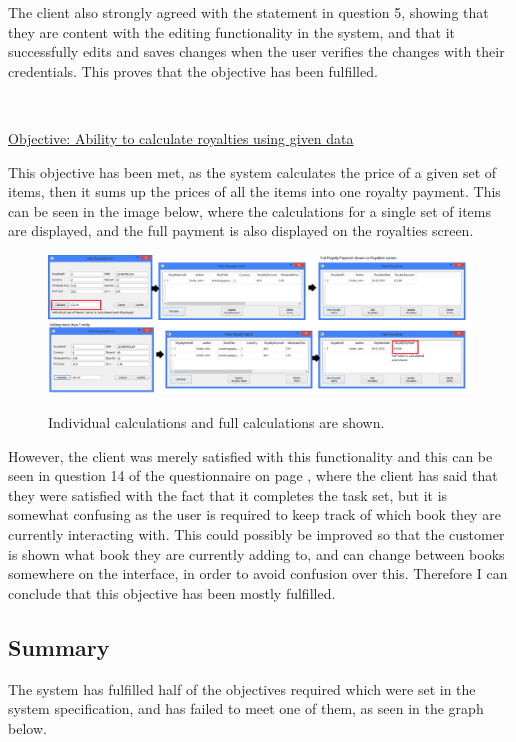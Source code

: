 The client also strongly agreed with the statement in question 5, showing that they are content with the editing functionality in the system, and that it successfully edits and saves changes when the user verifies the changes with their credentials. This proves that the objective has been fulfilled.

\

\underline{Objective: Ability to calculate royalties using given data}

This objective has been met, as the system calculates the price of a given set of items, then it sums up the prices of all the items into one royalty payment. This can be seen in the image below, where the calculations for a single set of items are displayed, and the full payment is also displayed on the royalties screen.

\begin{figure}[H]
    \includegraphics[width=\textwidth]{./Evaluation/Evidence/CalculateRoyalties.png}
    \label{fig:CalculateRoyalties} \caption{Individual calculations and full calculations are shown.}
\end{figure}

However, the client was merely satisfied with this functionality and this can be seen in question 14 of the questionnaire on page \pageref{fig:QuestionnairePage2}, where the client has said that they were satisfied with the fact that it completes the task set, but it is somewhat confusing as the user is required to keep track of which book they are currently interacting with. This could possibly be improved so that the customer is shown what book they are currently adding to, and can change between books somewhere on the interface, in order to avoid confusion over this. Therefore I can conclude that this objective has been mostly fulfilled.

\subsection{Summary}

The system has fulfilled half of the objectives required which were set in the system specification, and has failed to meet one of them, as seen in the graph below.

